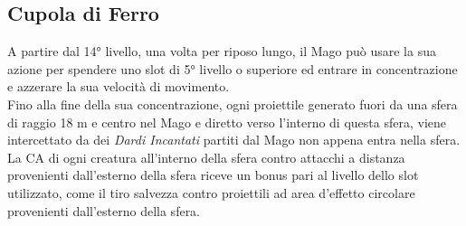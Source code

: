 \subsection{Cupola di Ferro}
A partire dal 14° livello, una volta per riposo lungo, il Mago può usare la sua azione per spendere uno slot di 5° livello o superiore ed entrare in concentrazione e azzerare la sua velocità di movimento. \\ Fino alla fine della sua concentrazione, ogni proiettile generato fuori da una sfera di raggio 18 m e centro nel Mago e diretto verso l'interno di questa sfera, viene intercettato da dei \textit{Dardi Incantati} partiti dal Mago non appena entra nella sfera. \\ La CA di ogni creatura all'interno della sfera contro attacchi a distanza provenienti dall'esterno della sfera riceve un bonus pari al livello dello slot utilizzato, come il tiro salvezza contro proiettili ad area d'effetto circolare provenienti dall'esterno della sfera.